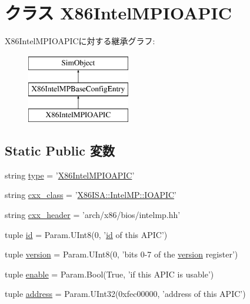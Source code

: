 \hypertarget{classIntelMP_1_1X86IntelMPIOAPIC}{
\section{クラス X86IntelMPIOAPIC}
\label{classIntelMP_1_1X86IntelMPIOAPIC}
}
X86IntelMPIOAPICに対する継承グラフ:\begin{figure}[H]
\begin{center}
\leavevmode
\includegraphics[height=3cm]{classIntelMP_1_1X86IntelMPIOAPIC}
\end{center}
\end{figure}
\subsection*{Static Public 変数}
\begin{DoxyCompactItemize}
\item 
string \hyperlink{classIntelMP_1_1X86IntelMPIOAPIC_acce15679d830831b0bbe8ebc2a60b2ca}{type} = '\hyperlink{classIntelMP_1_1X86IntelMPIOAPIC}{X86IntelMPIOAPIC}'
\item 
string \hyperlink{classIntelMP_1_1X86IntelMPIOAPIC_a58cd55cd4023648e138237cfc0822ae3}{cxx\_\-class} = '\hyperlink{classX86ISA_1_1IntelMP_1_1IOAPIC}{X86ISA::IntelMP::IOAPIC}'
\item 
string \hyperlink{classIntelMP_1_1X86IntelMPIOAPIC_a17da7064bc5c518791f0c891eff05fda}{cxx\_\-header} = 'arch/x86/bios/intelmp.hh'
\item 
tuple \hyperlink{classIntelMP_1_1X86IntelMPIOAPIC_a0e43f6071072440917ee2dd8af07d251}{id} = Param.UInt8(0, '\hyperlink{classIntelMP_1_1X86IntelMPIOAPIC_a0e43f6071072440917ee2dd8af07d251}{id} of this APIC')
\item 
tuple \hyperlink{classIntelMP_1_1X86IntelMPIOAPIC_a76aa01cd80eeb03b381ebe36f17c16b2}{version} = Param.UInt8(0, 'bits 0-\/7 of the \hyperlink{classIntelMP_1_1X86IntelMPIOAPIC_a76aa01cd80eeb03b381ebe36f17c16b2}{version} register')
\item 
tuple \hyperlink{classIntelMP_1_1X86IntelMPIOAPIC_abe5c47d3a1803e0ccf098c3dc333116a}{enable} = Param.Bool(True, 'if this APIC is usable')
\item 
tuple \hyperlink{classIntelMP_1_1X86IntelMPIOAPIC_a8c6c97c073c5563f4af9547714a7652c}{address} = Param.UInt32(0xfec00000, 'address of this APIC')
\end{DoxyCompactItemize}


